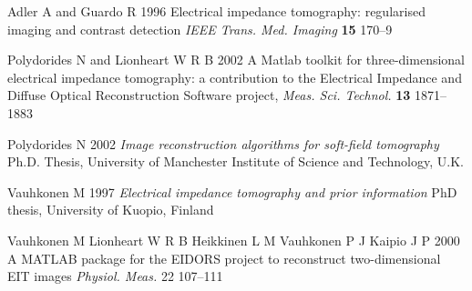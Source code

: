 \documentclass[12pt]{iopart}
\begin{document}
\References %

\item[]
Adler A and Guardo R
1996
Electrical impedance tomography: regularised imaging and contrast detection 
\textit{IEEE Trans. Med. Imaging} \textbf{15} 170--9

\item[] 
Polydorides N and Lionheart W R B
2002
A Matlab toolkit for three-dimensional electrical impedance
tomography: a contribution to the Electrical Impedance and
Diffuse Optical Reconstruction Software project,
{\it Meas. Sci. Technol.} {\bf 13} 1871--1883 

\item[] 
Polydorides N 
2002
{\it Image reconstruction algorithms for soft-field tomography}
Ph.D. Thesis,
University of Manchester Institute of Science and Technology, U.K. 

\item[] 
Vauhkonen M 
1997
{\it Electrical impedance tomography and prior information}
PhD thesis, University of Kuopio, Finland 

\item[] 
Vauhkonen M
Lionheart W R B
Heikkinen L M
Vauhkonen P J
Kaipio J P 
2000
A MATLAB package for the EIDORS project to reconstruct
two-dimensional EIT images
{\it Physiol. Meas.} 22 107--111 


\endrefs
\end{document}
